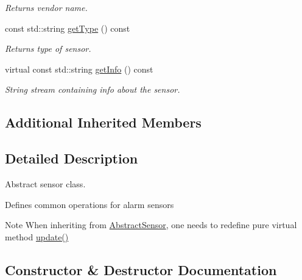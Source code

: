 \begin{DoxyCompactItemize}
\begin{DoxyCompactList}\small\item\em Returns vendor name. \end{DoxyCompactList}\item 
const std\+::string \hyperlink{classAbstractSensor_a31f55a2259b24f124b64a3ddd3004d6e}{get\+Type} () const \hypertarget{classAbstractSensor_a31f55a2259b24f124b64a3ddd3004d6e}{}\label{classAbstractSensor_a31f55a2259b24f124b64a3ddd3004d6e}

\begin{DoxyCompactList}\small\item\em Returns type of sensor. \end{DoxyCompactList}\item 
virtual const std\+::string \hyperlink{classAbstractSensor_a3b498785d810c29b3d20254a365adb43}{get\+Info} () const \hypertarget{classAbstractSensor_a3b498785d810c29b3d20254a365adb43}{}\label{classAbstractSensor_a3b498785d810c29b3d20254a365adb43}

\begin{DoxyCompactList}\small\item\em String stream containing info about the sensor. \end{DoxyCompactList}\end{DoxyCompactItemize}
\subsection*{Additional Inherited Members}


\subsection{Detailed Description}
Abstract sensor class. 

Defines common operations for alarm sensors

\begin{DoxyNote}{Note}
When inheriting from \hyperlink{classAbstractSensor}{Abstract\+Sensor}, one needs to redefine pure virtual method \hyperlink{classAbstractSensor_a8d0a1908c6aaf67fc7d781e54b49293b}{update()} 
\end{DoxyNote}


\subsection{Constructor \& Destructor Documentation}

